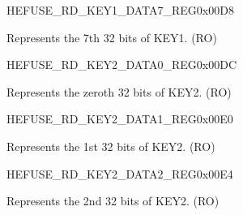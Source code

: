 \begin{register}{H}{EFUSE\_RD\_KEY1\_DATA7\_REG}{0x00D8}\label{regdesc:EFUSERDKEY1DATA7REG}
%
\regnewline%
\begin{regdesc}\begin{reglist}
\label{fielddesc:EFUSEKEY1DATA7}\item [EFUSE\_KEY1\_DATA7] Represents the 7th 32 bits of KEY1. (RO)
\end{reglist}\end{regdesc}
\end{register}


\begin{register}{H}{EFUSE\_RD\_KEY2\_DATA0\_REG}{0x00DC}\label{regdesc:EFUSERDKEY2DATA0REG}
%
\regnewline%
\begin{regdesc}\begin{reglist}
\label{fielddesc:EFUSEKEY2DATA0}\item [EFUSE\_KEY2\_DATA0] Represents the zeroth 32 bits of KEY2. (RO)
\end{reglist}\end{regdesc}
\end{register}


\begin{register}{H}{EFUSE\_RD\_KEY2\_DATA1\_REG}{0x00E0}\label{regdesc:EFUSERDKEY2DATA1REG}
%
\regnewline%
\begin{regdesc}\begin{reglist}
\label{fielddesc:EFUSEKEY2DATA1}\item [EFUSE\_KEY2\_DATA1] Represents the 1st 32 bits of KEY2. (RO)
\end{reglist}\end{regdesc}
\end{register}


\begin{register}{H}{EFUSE\_RD\_KEY2\_DATA2\_REG}{0x00E4}\label{regdesc:EFUSERDKEY2DATA2REG}
%
\regnewline%
\begin{regdesc}\begin{reglist}
\label{fielddesc:EFUSEKEY2DATA2}\item [EFUSE\_KEY2\_DATA2] Represents the 2nd 32 bits of KEY2. (RO)
\end{reglist}\end{regdesc}
\end{register}


